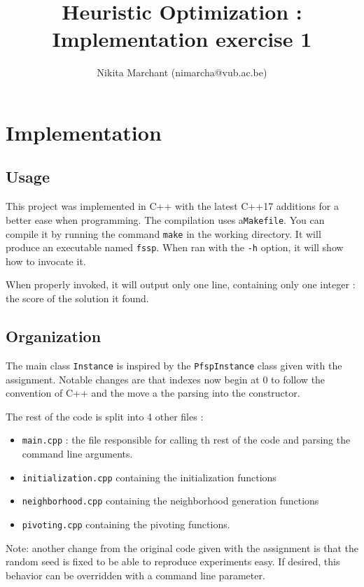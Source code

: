 \documentclass[a4paper]{article}
\title{Heuristic Optimization : Implementation exercise 1}
\author{Nikita Marchant (nimarcha@vub.ac.be)}
\begin{document}
\maketitle

\section{Implementation}

\subsection{Usage}
This project was implemented in C++ with the latest C++17 additions for a better ease when programming.
The compilation uses a\texttt{Makefile}. You can compile it by running the command \texttt{make} in the working directory. It will produce an executable named \texttt{fssp}. When ran with the \texttt{-h} option, it will show how to invocate it.

When properly invoked, it will output only one line, containing only one integer : the score of the solution it found.

\subsection{Organization}

The main class \texttt{Instance} is inspired by the \texttt{PfspInstance} class given with the assignment.
Notable changes are that indexes now begin at 0 to follow the convention of C++ and the move a the parsing into the constructor.

The rest of the code is split into 4 other files :
\begin{itemize}
\item \texttt{main.cpp} : the file responsible for calling th rest of the code and parsing the command line arguments.
\item \texttt{initialization.cpp} containing the initialization functions
\item \texttt{neighborhood.cpp} containing the neighborhood generation functions
\item \texttt{pivoting.cpp} containing the pivoting functions.
\end{itemize}

Note: another change from the original code given with the assignment is that the random seed is fixed to be able to reproduce experiments easy. If desired, this behavior can be overridden with a command line parameter.
\end{document}
